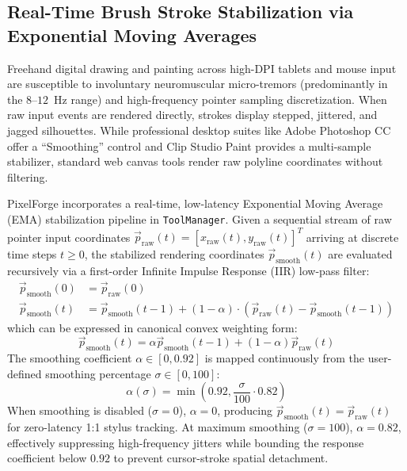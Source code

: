 \documentclass[10pt,journal,compsoc]{IEEEtran}
\begin{document}
\subsection{Real-Time Brush Stroke Stabilization via Exponential Moving Averages}
Freehand digital drawing and painting across high-DPI tablets and mouse input are susceptible to involuntary neuromuscular micro-tremors (predominantly in the $8\text{--}12$~Hz range) and high-frequency pointer sampling discretization. When raw input events are rendered directly, strokes display stepped, jittered, and jagged silhouettes. While professional desktop suites like Adobe Photoshop CC offer a ``Smoothing'' control and Clip Studio Paint provides a multi-sample stabilizer, standard web canvas tools render raw polyline coordinates without filtering.

PixelForge incorporates a real-time, low-latency Exponential Moving Average (EMA) stabilization pipeline in \texttt{ToolManager}. Given a sequential stream of raw pointer input coordinates $\vec{p}_{\text{raw}}(t) = [x_{\text{raw}}(t), y_{\text{raw}}(t)]^T$ arriving at discrete time steps $t \ge 0$, the stabilized rendering coordinates $\vec{p}_{\text{smooth}}(t)$ are evaluated recursively via a first-order Infinite Impulse Response (IIR) low-pass filter:
\begin{align}
\vec{p}_{\text{smooth}}(0) &= \vec{p}_{\text{raw}}(0) \\
\vec{p}_{\text{smooth}}(t) &= \vec{p}_{\text{smooth}}(t-1) + (1 - \alpha) \cdot \left(\vec{p}_{\text{raw}}(t) - \vec{p}_{\text{smooth}}(t-1)\right)
\end{align}
which can be expressed in canonical convex weighting form:
\begin{equation}
\vec{p}_{\text{smooth}}(t) = \alpha \vec{p}_{\text{smooth}}(t-1) + (1 - \alpha) \vec{p}_{\text{raw}}(t)
\end{equation}
The smoothing coefficient $\alpha \in [0, 0.92]$ is mapped continuously from the user-defined smoothing percentage $\sigma \in [0, 100]$:
\begin{equation}
\alpha(\sigma) = \min\left(0.92, \frac{\sigma}{100} \cdot 0.82\right)
\end{equation}
When smoothing is disabled ($\sigma = 0$), $\alpha = 0$, producing $\vec{p}_{\text{smooth}}(t) = \vec{p}_{\text{raw}}(t)$ for zero-latency 1:1 stylus tracking. At maximum smoothing ($\sigma = 100$), $\alpha = 0.82$, effectively suppressing high-frequency jitters while bounding the response coefficient below $0.92$ to prevent cursor-stroke spatial detachment.
\end{document}
